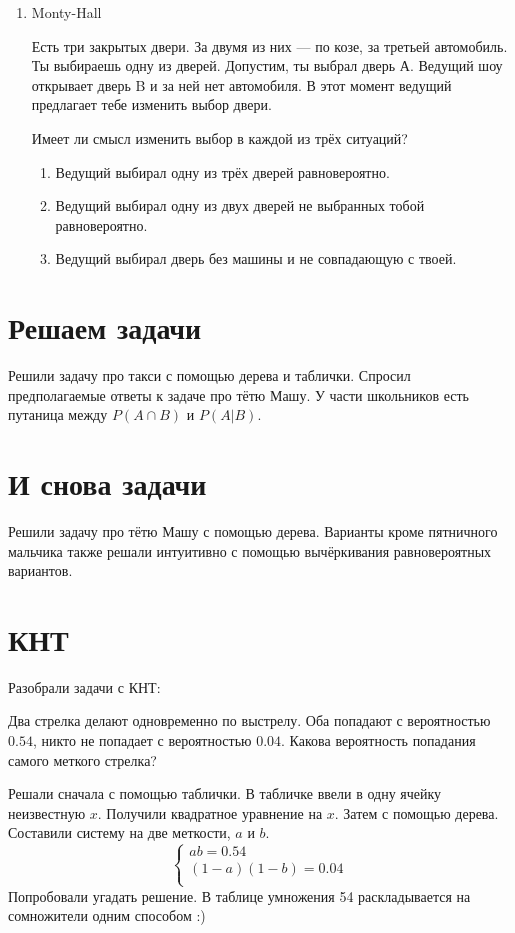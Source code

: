 \documentclass[a4paper, 12pt]{article}
\begin{document}
\begin{enumerate}
\item Monty-Hall

Есть три закрытых двери. За двумя из них — по козе, за третьей автомобиль. Ты выбираешь одну из дверей. Допустим, ты выбрал дверь А. Ведущий шоу открывает дверь B и за ней нет автомобиля.
В этот момент ведущий предлагает тебе изменить выбор двери.

Имеет ли смысл изменить выбор в каждой из трёх ситуаций?
\begin{enumerate}
  \item Ведущий выбирал одну из трёх дверей равновероятно.
  \item Ведущий выбирал одну из двух дверей не выбранных тобой равновероятно.
  \item Ведущий выбирал дверь без машины и не совпадающую с твоей.
\end{enumerate}

\end{enumerate}



\newpage
\section{Решаем задачи}

Решили задачу про такси с помощью дерева и таблички. Спросил предполагаемые ответы к задаче про тётю Машу. У части школьников есть путаница между $P(A\cap B)$ и $P(A|B)$.

\section{И снова задачи}

Решили задачу про тётю Машу с помощью дерева. Варианты кроме пятничного мальчика также решали интуитивно с помощью вычёркивания равновероятных вариантов.

\section{КНТ}

Разобрали задачи с КНТ:

Два стрелка делают одновременно по выстрелу. Оба попадают с вероятностью $0.54$, никто не попадает с вероятностью $0.04$. Какова вероятность попадания самого меткого стрелка?

Решали сначала с помощью таблички. В табличке ввели в одну ячейку неизвестную $x$. Получили квадратное уравнение на $x$. Затем с помощью дерева. Составили систему на две меткости, $a$ и $b$.
\[
\begin{cases}
ab=0.54 \\
(1-a)(1-b)=0.04 \\
\end{cases}
\]
Попробовали угадать решение. В таблице умножения 54 раскладывается на сомножители одним способом :)
\end{document}
